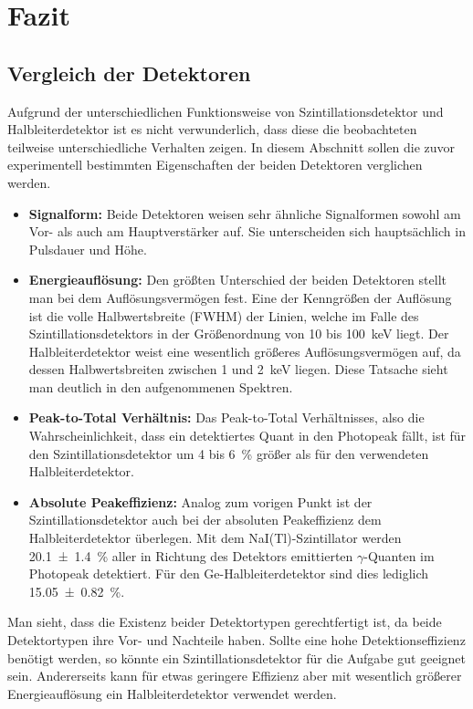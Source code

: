 \documentclass[11pt, a4paper]{article}
\numberwithin{equation}{section}
\begin{document}
\section{Fazit}

\subsection{Vergleich der Detektoren}
Aufgrund der unterschiedlichen Funktionsweise von Szintillationsdetektor und Halbleiterdetektor ist es nicht verwunderlich, dass diese die beobachteten teilweise unterschiedliche Verhalten zeigen.
In diesem Abschnitt sollen die zuvor experimentell bestimmten Eigenschaften der beiden Detektoren verglichen werden.
\begin{itemize}
	\item \textbf{Signalform:} Beide Detektoren weisen sehr ähnliche Signalformen sowohl am Vor- als auch am Hauptverstärker auf. Sie unterscheiden sich hauptsächlich in Pulsdauer und Höhe.
	
	\item \textbf{Energieauflösung:} Den größten Unterschied der beiden Detektoren stellt man bei dem Auflösungsvermögen fest.
	Eine der Kenngrößen der Auflösung ist die volle Halbwertsbreite (FWHM) der Linien, welche im Falle des Szintillationsdetektors in der Größenordnung von \num{10} bis \SI{100}{keV} liegt.
	Der Halbleiterdetektor weist eine wesentlich größeres Auflösungsvermögen auf, da dessen Halbwertsbreiten zwischen \num{1} und \SI{2}{keV} liegen.
	Diese Tatsache sieht man deutlich in den aufgenommenen Spektren.	
	
	\item \textbf{Peak-to-Total Verhältnis:}
	Das Peak-to-Total Verhältnisses, also die Wahrscheinlichkeit, dass ein detektiertes Quant in den Photopeak fällt, ist für den Szintillationsdetektor um \num{4} bis \SI{6}{\percent} größer als für den verwendeten Halbleiterdetektor.
	
	\item \textbf{Absolute Peakeffizienz:}
	Analog zum vorigen Punkt ist der Szintillationsdetektor auch bei der absoluten Peakeffizienz dem Halbleiterdetektor überlegen.
	Mit dem NaI(Tl)-Szintillator werden \SI{20.1 +- 1.4}{\percent} aller in Richtung des Detektors emittierten $\gamma$-Quanten im Photopeak detektiert.
	Für den Ge-Halbleiterdetektor sind dies lediglich \SI{15.05 +- 0.82}{\percent}.
	
\end{itemize}
Man sieht, dass die Existenz beider Detektortypen gerechtfertigt ist, da beide Detektortypen ihre Vor- und Nachteile haben.
Sollte eine hohe Detektionseffizienz benötigt werden, so könnte ein Szintillationsdetektor für die Aufgabe gut geeignet sein.
Andererseits kann für etwas geringere Effizienz aber mit wesentlich größerer Energieauflösung ein Halbleiterdetektor verwendet werden.
\end{document}
